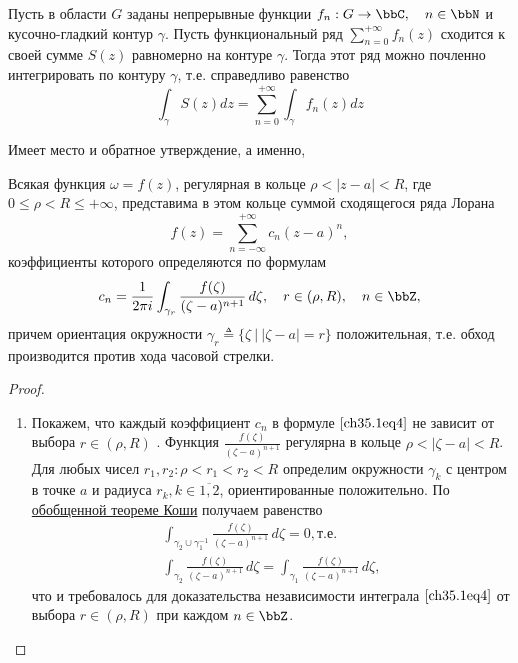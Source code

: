 \begin{thm} \label{ch35.1Thm6}
Пусть в области $G$ заданы непрерывные функции $f_n: G \to \bbC,\quad n \in \bbN$ и кусочно-гладкий контур $\gamma$. Пусть функциональный ряд $\sum\limits_{n=0}^{+\infty} f_n(z)$ сходится к своей сумме $S(z)$ равномерно на контуре $\gamma$. Тогда этот ряд можно почленно интегрировать по контуру $\gamma$, т.е. справедливо равенство
\begin{equation}
\int_{\gamma} S(z)dz = \sum\limits_{n=0}^{+\infty} \int_{\gamma} f_n(z)dz
\end{equation}
\end{thm} 

Имеет место и обратное утверждение, а именно, 

\begin{leftbar}
\begin{thm} \label{ch35.1Thm1}
Всякая функция $\omega = f(z)$, регулярная в кольце $\rho < |z - a| < R$, где $0 \le \rho < R \le +\infty$, представима в этом кольце суммой сходящегося ряда Лорана
$$
f(z) = \sum\limits_{n = -\infty}^{+\infty} c_n(z - a)^n,
$$
коэффициенты которого определяются по формулам
\begin{equation} \label{ch35.1eq4}
c_n = \frac{1}{2\pi i} \int_{\gamma_r} \frac{f(\zeta)}{(\zeta - a)^{n + 1}} \,d\zeta, \quad r \in (\rho, R), \quad n \in \bbZ,
\end{equation}
причем ориентация окружности $\gamma_r \triangleq \{\zeta \: \big| \: |\zeta - a| = r\}$ положительная, т.е. обход производится против хода часовой стрелки.

\end{thm}

\begin{proof}


\begin{enumerate}
	
\item
Покажем, что каждый коэффициент $c_n$ в формуле $\eqref{ch35.1eq4}$ не зависит от выбора $r \in (\rho, R)$ . Функция $\frac{f(\zeta)}{(\zeta - a)^{n+1}}$ регулярна в кольце $\rho < |\zeta - a| < R$. Для любых чисел $r_1, r_2: \rho < r_1 < r_2 < R$ определим окружности $\gamma_k$ с центром в точке $a$ и радиуса $r_k, k \in \overline{1,2}$, ориентированные положительно. По \hyperref[abc28]{обобщенной теореме Коши} получаем равенство
\begin{equation*}
\begin{split}
\int_{\gamma_2 \cup \gamma_{1}^{-1}} \frac{f(\zeta)}{(\zeta - a)^{n + 1}} \,d\zeta = 0, \text{т.е.}\\
\int_{\gamma_2} \frac{f(\zeta)}{(\zeta - a)^{n + 1}} \,d\zeta = \int_{\gamma_1} \frac{f(\zeta)}{(\zeta - a)^{n + 1}} \,d\zeta,
\end{split}
\end{equation*}
что и требовалось для доказательства независимости интеграла $\eqref{ch35.1eq4}$ от выбора $r \in (\rho, R)$ при каждом $n \in \bbZ$.


\end{enumerate}
\end{proof}
\end{leftbar}
